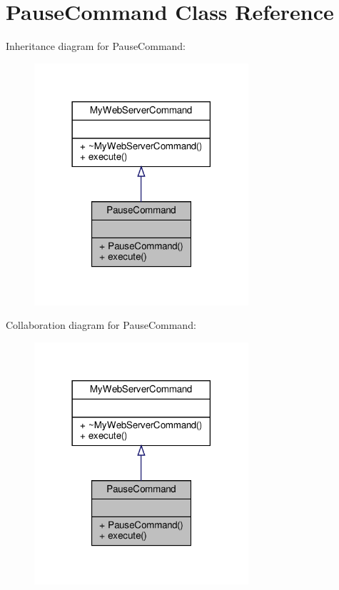 \hypertarget{classPauseCommand}{}\section{Pause\+Command Class Reference}
\label{classPauseCommand}


Inheritance diagram for Pause\+Command\+:\nopagebreak
\begin{figure}[H]
\begin{center}
\leavevmode
\includegraphics[width=225pt]{classPauseCommand__inherit__graph}
\end{center}
\end{figure}


Collaboration diagram for Pause\+Command\+:\nopagebreak
\begin{figure}[H]
\begin{center}
\leavevmode
\includegraphics[width=225pt]{classPauseCommand__coll__graph}
\end{center}
\end{figure}
